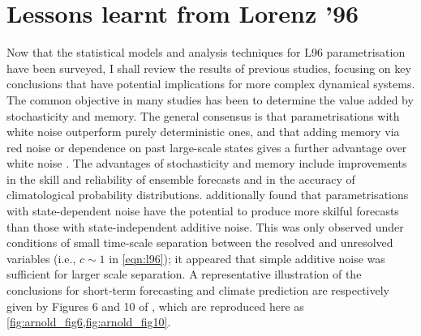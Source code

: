 \documentclass[../main.tex]{subfiles}
\begin{document}
\section{Lessons learnt from Lorenz '96}
Now that the statistical models and analysis techniques for L96 parametrisation
have been surveyed, I shall review the results of previous studies, focusing on
key conclusions that have potential implications for more complex dynamical
systems. The common objective in many studies has been to determine the value
added by stochasticity and memory. The general consensus is that
parametrisations with white noise outperform purely deterministic ones, and
that adding memory via red noise or dependence on past large-scale states gives
a further advantage over white noise
\parencite{wilks2005,arnold2013,gagne2020}. The advantages of stochasticity and
memory include improvements in the skill and reliability of ensemble forecasts
and in the accuracy of climatological probability distributions.
\textcite{arnold2013} additionally found that parametrisations with
state-dependent noise have the potential to produce more skilful forecasts than
those with state-independent additive noise. This was only observed under
conditions of small time-scale separation between the resolved and unresolved
variables (i.e., $c \sim 1$ in \cref{eqn:l96}); it appeared that simple
additive noise was sufficient for larger scale separation. A representative
illustration of the conclusions for short-term forecasting and climate
prediction are respectively given by Figures 6 and 10 of
\citeauthor{arnold2013}, which are reproduced here as
\cref{fig:arnold_fig6,fig:arnold_fig10}.
\end{document}
